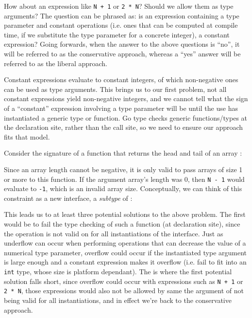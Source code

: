 How about an expression like \texttt{N + 1} or \texttt{2 * N}? Should we allow
them as  type arguments? The question can be phrased as: is an
expression containing a  type parameter and constant operations (i.e.
ones that can be computed at compile time, if we substitute the type parameter
for a concrete integer), a constant expression? Going forwards, when the answer
to the above questions is ``no'', it will be referred to as the conservative
approach, whereas a ``yes'' answer will be referred to as the liberal approach.

Constant expressions evaluate to constant integers, of which non-negative ones
can be used as  type arguments. This brings us to our first problem,
not all constant expressions yield non-negative integers, and we cannot tell
what the sign of a ``constant'' expression involving a type parameter will be
until the use has instantiated a generic type or function. Go type checks
generic functions/types at the declaration site, rather than the call site, so
we need to ensure our approach fits that model.

Consider the signature of a function that returns the head and tail of an array
\autocite{rustConstBlog}:


Since an array length cannot be negative, it is only valid to pass arrays of
size 1 or more to this function. If the argument array's length was 0, then
\texttt{N - 1} would evaluate to \texttt{-1}, which is an invalid array size.
Conceptually, we can think of this constraint as a new interface, a
\emph{subtype} of :


This leads us to at least three potential solutions to the above problem. The
first would be to fail the type checking of such a function (at declaration
site), since the operation is not valid on for all instantiations of the
 interface. Just as underflow can occur when performing operations
that can decrease the value of a numerical type parameter, overflow could occur
if the instantiated type argument is large enough and a constant expression
makes it overflow (i.e. fail to fit into an \texttt{int} type, whose size is
platform dependant). The is where the first potential solution falls short,
since overflow could occur with expressions such as \texttt{N + 1} or \texttt{2
    * N}, those expressions would also not be allowed by same the argument of not
being valid for all instantiations, and in effect we're back to the conservative
approach.

